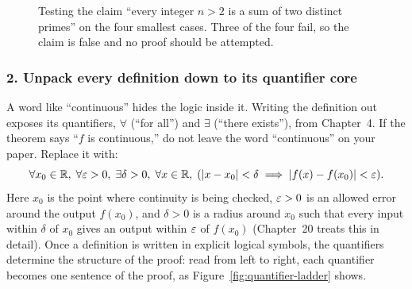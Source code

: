 \begin{figure}[htbp]
\centering
{}
\caption{Testing the claim ``every integer $n > 2$ is a sum of two distinct primes'' on the four smallest cases. Three of the four fail, so the claim is false and no proof should be attempted.}
\label{fig:small-cases}
\end{figure}

\subsubsection{2. Unpack every definition down to its quantifier core}
A word like ``continuous'' hides the logic inside it. Writing the definition out exposes its quantifiers, $\forall$ (``for all'') and $\exists$ (``there exists''), from Chapter~4. If the theorem says ``$f$ is continuous,'' do not leave the word ``continuous'' on your paper. Replace it with:
\[
\forall x_0 \in \mathbb{R}, \; \forall \varepsilon > 0, \; \exists \delta > 0, \; \forall x \in \mathbb{R}, \; (|x - x_0| < \delta \implies |f(x) - f(x_0)| < \varepsilon).
\]
Here $x_0$ is the point where continuity is being checked, $\varepsilon > 0$ is an allowed error around the output $f(x_0)$, and $\delta > 0$ is a radius around $x_0$ such that every input within $\delta$ of $x_0$ gives an output within $\varepsilon$ of $f(x_0)$ (Chapter~20 treats this in detail). Once a definition is written in explicit logical symbols, the quantifiers determine the structure of the proof: read from left to right, each quantifier becomes one sentence of the proof, as Figure~\ref{fig:quantifier-ladder} shows.

